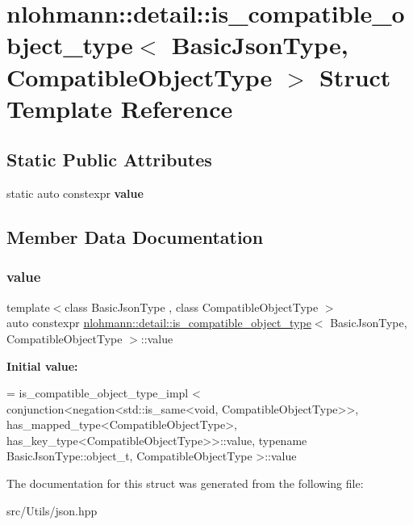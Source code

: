 \hypertarget{structnlohmann_1_1detail_1_1is__compatible__object__type}{}\section{nlohmann\+:\+:detail\+:\+:is\+\_\+compatible\+\_\+object\+\_\+type$<$ Basic\+Json\+Type, Compatible\+Object\+Type $>$ Struct Template Reference}
\label{structnlohmann_1_1detail_1_1is__compatible__object__type}
\subsection*{Static Public Attributes}
\begin{DoxyCompactItemize}
\item 
static auto constexpr {\bfseries value}
\end{DoxyCompactItemize}


\subsection{Member Data Documentation}
\mbox{\label{structnlohmann_1_1detail_1_1is__compatible__object__type_a87cce7bcdcd22cc8517f171705f6a7c7}} 
\subsubsection{\texorpdfstring{value}{value}}
{\footnotesize\ttfamily template$<$class Basic\+Json\+Type , class Compatible\+Object\+Type $>$ \\
auto constexpr \mbox{\hyperlink{structnlohmann_1_1detail_1_1is__compatible__object__type}{nlohmann\+::detail\+::is\+\_\+compatible\+\_\+object\+\_\+type}}$<$ Basic\+Json\+Type, Compatible\+Object\+Type $>$\+::value\hspace{0.3cm}{\ttfamily [static]}}

{\bfseries Initial value\+:}
\begin{DoxyCode}
= is\_compatible\_object\_type\_impl <
                                  conjunction<negation<std::is\_same<void, CompatibleObjectType>>,
                                  has\_mapped\_type<CompatibleObjectType>,
                                  has\_key\_type<CompatibleObjectType>>::value,
                                  \textcolor{keyword}{typename} BasicJsonType::object\_t, CompatibleObjectType >::value
\end{DoxyCode}


The documentation for this struct was generated from the following file\+:\begin{DoxyCompactItemize}
\item 
src/\+Utils/json.\+hpp\end{DoxyCompactItemize}
